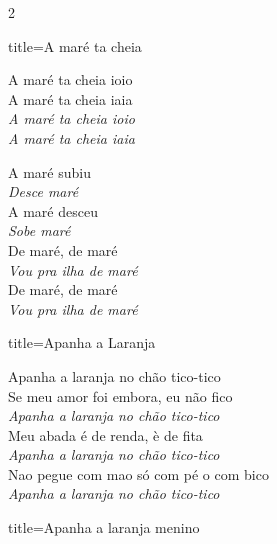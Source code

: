 \documentclass[fontsize=14pt, paper=a4, twoside, DIV=20]{scrreprt} %
\begin{document}
\begin{multicols*}{2}
\begin{song}{title={A maré ta cheia}}
        \begin{chorus*}
                A maré ta cheia ioio \\
                A maré ta cheia iaia \\
                \textit{A maré ta cheia ioio \\
                A maré ta cheia iaia \\}
        \end{chorus*}
        \begin{verse*}
                A maré subiu \\
                \textit{Desce maré} \\
                A maré desceu \\
                \textit{Sobe maré} \\
                De maré, de maré \\
                \textit{Vou pra ilha de maré} \\
                De maré, de maré \\
                \textit{Vou pra ilha de maré} \\

        \end{verse*}
\end{song}

\begin{song}{title={Apanha a Laranja}}

    \begin{verse*}
        Apanha a laranja no chão tico-tico\\
        Se meu amor foi embora, eu não fico\\

        \textit{Apanha a laranja} \textit{no chão tico-tico}\\
        Meu abada é de renda, è de fita\\
        \textit{Apanha a laranja} \textit{no chão tico-tico}\\
        Nao pegue com mao só com pé o com bico\\
        \textit{Apanha a laranja} \textit{no chão tico-tico} \\
    \end{verse*}

\end{song}


\columnbreak
\begin{song}{title={Apanha a laranja menino}}


\end{song}
\end{multicols*}
\end{document}

